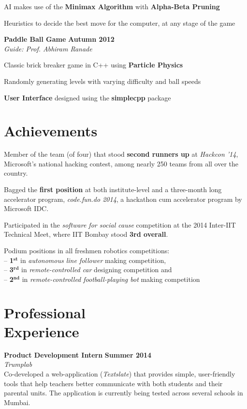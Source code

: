 \documentclass[margin,11pt]{resume}
\begin{document}
\begin{resume}
\begin{list2}
\item AI makes use of the \textbf{Minimax Algorithm} with \textbf{Alpha-Beta Pruning}
\item Heuristics to decide the best move for the computer, at any stage of the game
\end{list2}
\vspace{-2.5mm}
\textbf{Paddle Ball Game} \hfill \textbf{Autumn 2012}\\
\textsl{Guide: Prof. Abhiram Ranade}
\begin{list2}
\item Classic brick breaker game in C++ using \textbf{Particle Physics} 
\item Randomly generating levels with varying difficulty and ball speeds 
\item \textbf{User Interface} designed using the \textbf{simplecpp} package
\end{list2}

\section{\mysidestyle Achievements}
\begin{list2}
\item Member of the team (of four) that stood \textbf{second runners up} at \textsl{Hackcon '14}, Microsoft's national hacking contest, among nearly 250 teams from all over the country.
\item Bagged the \textbf{first position} at both institute-level and a three-month long accelerator program, \textsl{code.fun.do 2014}, a hackathon cum accelerator program by Microsoft IDC.
\item Participated in the \textsl{software for social cause} competition at the 2014 Inter-IIT Technical Meet, where IIT Bombay stood \textbf{3rd overall}.
\item Podium positions in all freshmen robotics competitions: \\
-- \textbf{1$^{\textbf{st}}$} in \textsl{autonomous line follower} making competition,\\ -- \textbf{3$^{\textbf{rd}}$} in \textsl{remote-controlled car} designing competition and\\ 
-- \textbf{2$^{\textbf{nd}}$} in \textsl{remote-controlled football-playing bot} making competition
\end{list2}

\section{\mysidestyle Professional \\ Experience}
\textbf{Product Development Intern} \hfill \textbf{Summer 2014}\\
\textsl{Trumplab}\\
Co-developed a web-application (\textsl{Textslate}) that provides simple, user-friendly tools that help teachers better communicate with both students and their parental units. The application is currently being tested across several schools in Mumbai.


\end{resume}
\end{document}
